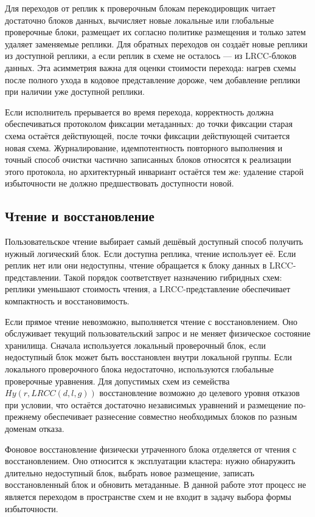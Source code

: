 Для переходов от реплик к проверочным блокам перекодировщик читает достаточно
блоков данных, вычисляет новые локальные или глобальные проверочные блоки,
размещает их согласно политике размещения и только затем удаляет заменяемые
реплики. Для обратных переходов он создаёт новые реплики из доступной реплики,
а если реплик в схеме не осталось --- из LRCC-блоков данных. Эта асимметрия
важна для оценки стоимости перехода: нагрев схемы после полного ухода в
кодовое представление дороже, чем добавление реплики при наличии уже доступной
реплики.

Если исполнитель прерывается во время перехода, корректность должна
обеспечиваться протоколом фиксации метаданных: до точки фиксации старая схема
остаётся действующей, после точки фиксации действующей считается новая схема.
Журналирование, идемпотентность повторного выполнения и точный способ очистки
частично записанных блоков относятся к реализации этого протокола, но
архитектурный инвариант остаётся тем же: удаление старой избыточности не должно
предшествовать доступности новой.

\subsection{Чтение и восстановление}

Пользовательское чтение выбирает самый дешёвый доступный способ получить
нужный логический блок. Если доступна реплика, чтение использует её. Если
реплик нет или они недоступны, чтение обращается к блоку данных в
LRCC-представлении. Такой порядок соответствует назначению гибридных схем:
реплики уменьшают стоимость чтения, а LRCC-представление обеспечивает
компактность и восстановимость.

Если прямое чтение невозможно, выполняется чтение с восстановлением. Оно
обслуживает текущий пользовательский запрос и не меняет физическое состояние
хранилища. Сначала используется локальный проверочный блок, если недоступный
блок может быть восстановлен внутри локальной группы. Если локального
проверочного блока недостаточно, используются глобальные проверочные
уравнения. Для допустимых схем из семейства \(Hy(r, LRCC(d,l,g))\)
восстановление возможно до целевого уровня отказов при условии, что остаётся
достаточно независимых уравнений и размещение по-прежнему обеспечивает
разнесение совместно необходимых блоков по разным доменам отказа.

Фоновое восстановление физически утраченного блока отделяется от чтения с
восстановлением. Оно относится к эксплуатации кластера: нужно обнаружить
длительно недоступный блок, выбрать новое размещение, записать восстановленный
блок и обновить метаданные. В данной работе этот процесс не является переходом
в пространстве схем и не входит в задачу выбора формы избыточности.


